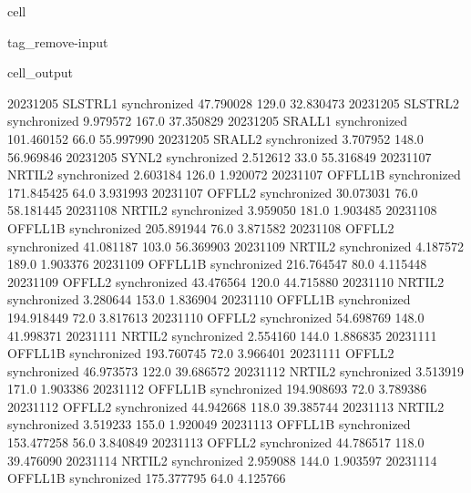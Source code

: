 \documentclass[letterpaper,10pt,english]{jupyterBook}
\begin{document}
\begin{sphinxuseclass}{cell}
\begin{sphinxuseclass}{tag_remove-input}
\begin{sphinxVerbatimOutput}
\begin{sphinxuseclass}{cell_output}
\begin{sphinxVerbatim}[commandchars=\\\{\}]
2023\PYGZhy{}12\PYGZhy{}05     SLSTR\PYGZus{}L1  synchronized   47.790028   129.0   32.830473
2023\PYGZhy{}12\PYGZhy{}05     SLSTR\PYGZus{}L2  synchronized    9.979572   167.0   37.350829
2023\PYGZhy{}12\PYGZhy{}05      SRAL\PYGZus{}L1  synchronized  101.460152    66.0   55.997990
2023\PYGZhy{}12\PYGZhy{}05      SRAL\PYGZus{}L2  synchronized    3.707952   148.0   56.969846
2023\PYGZhy{}12\PYGZhy{}05       SYN\PYGZus{}L2  synchronized    2.512612    33.0   55.316849
2023\PYGZhy{}11\PYGZhy{}07      NRTI\PYGZus{}L2  synchronized    2.603184   126.0    1.920072
2023\PYGZhy{}11\PYGZhy{}07     OFFL\PYGZus{}L1B  synchronized  171.845425    64.0    3.931993
2023\PYGZhy{}11\PYGZhy{}07      OFFL\PYGZus{}L2  synchronized   30.073031    76.0   58.181445
2023\PYGZhy{}11\PYGZhy{}08      NRTI\PYGZus{}L2  synchronized    3.959050   181.0    1.903485
2023\PYGZhy{}11\PYGZhy{}08     OFFL\PYGZus{}L1B  synchronized  205.891944    76.0    3.871582
2023\PYGZhy{}11\PYGZhy{}08      OFFL\PYGZus{}L2  synchronized   41.081187   103.0   56.369903
2023\PYGZhy{}11\PYGZhy{}09      NRTI\PYGZus{}L2  synchronized    4.187572   189.0    1.903376
2023\PYGZhy{}11\PYGZhy{}09     OFFL\PYGZus{}L1B  synchronized  216.764547    80.0    4.115448
2023\PYGZhy{}11\PYGZhy{}09      OFFL\PYGZus{}L2  synchronized   43.476564   120.0   44.715880
2023\PYGZhy{}11\PYGZhy{}10      NRTI\PYGZus{}L2  synchronized    3.280644   153.0    1.836904
2023\PYGZhy{}11\PYGZhy{}10     OFFL\PYGZus{}L1B  synchronized  194.918449    72.0    3.817613
2023\PYGZhy{}11\PYGZhy{}10      OFFL\PYGZus{}L2  synchronized   54.698769   148.0   41.998371
2023\PYGZhy{}11\PYGZhy{}11      NRTI\PYGZus{}L2  synchronized    2.554160   144.0    1.886835
2023\PYGZhy{}11\PYGZhy{}11     OFFL\PYGZus{}L1B  synchronized  193.760745    72.0    3.966401
2023\PYGZhy{}11\PYGZhy{}11      OFFL\PYGZus{}L2  synchronized   46.973573   122.0   39.686572
2023\PYGZhy{}11\PYGZhy{}12      NRTI\PYGZus{}L2  synchronized    3.513919   171.0    1.903386
2023\PYGZhy{}11\PYGZhy{}12     OFFL\PYGZus{}L1B  synchronized  194.908693    72.0    3.789386
2023\PYGZhy{}11\PYGZhy{}12      OFFL\PYGZus{}L2  synchronized   44.942668   118.0   39.385744
2023\PYGZhy{}11\PYGZhy{}13      NRTI\PYGZus{}L2  synchronized    3.519233   155.0    1.920049
2023\PYGZhy{}11\PYGZhy{}13     OFFL\PYGZus{}L1B  synchronized  153.477258    56.0    3.840849
2023\PYGZhy{}11\PYGZhy{}13      OFFL\PYGZus{}L2  synchronized   44.786517   118.0   39.476090
2023\PYGZhy{}11\PYGZhy{}14      NRTI\PYGZus{}L2  synchronized    2.959088   144.0    1.903597
2023\PYGZhy{}11\PYGZhy{}14     OFFL\PYGZus{}L1B  synchronized  175.377795    64.0    4.125766

\end{sphinxVerbatim}
\end{sphinxuseclass}
\end{sphinxVerbatimOutput}
\end{sphinxuseclass}
\end{sphinxuseclass}
\end{document}
